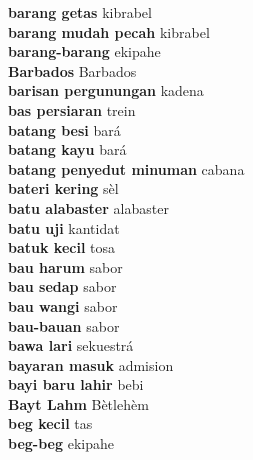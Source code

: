 \textbf{ barang getas  } kibrabel \\
\textbf{ barang mudah pecah  } kibrabel \\
\textbf{ barang-barang  } ekipahe \\
\textbf{ Barbados  } Barbados \\
\textbf{ barisan pergunungan  } kadena \\
\textbf{ bas persiaran  } trein \\
\textbf{ batang besi  } bará \\
\textbf{ batang kayu  } bará \\
\textbf{ batang penyedut minuman  } cabana \\
\textbf{ bateri kering  } sèl \\
\textbf{ batu alabaster  } alabaster \\
\textbf{ batu uji  } kantidat \\
\textbf{ batuk kecil  } tosa \\
\textbf{ bau harum  } sabor \\
\textbf{ bau sedap  } sabor \\
\textbf{ bau wangi  } sabor \\
\textbf{ bau-bauan  } sabor \\
\textbf{ bawa lari  } sekuestrá \\
\textbf{ bayaran masuk  } admision \\
\textbf{ bayi baru lahir  } bebi \\
\textbf{ Bayt Lahm  } Bètlehèm \\
\textbf{ beg kecil  } tas \\
\textbf{ beg-beg  } ekipahe \\
